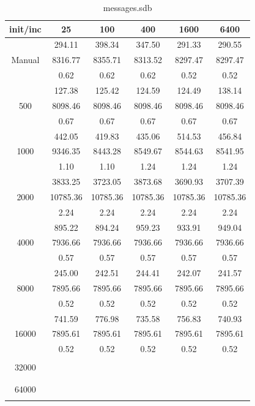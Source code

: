 {\begin{table}[th]
\caption{messages.sdb}
\label{tab:messages.sdb}
\centering
\begin{tabular}{|c||c|c|c|c|c|}
\hline
init/inc & 25 & 100 & 400 & 1600 & 6400 \\ \hline \hline
       & 294.11     & 398.34   & 347.50   & 291.33   & 290.55 \\
Manual & 8316.77    & 8355.71  & 8313.52  & 8297.47  & 8297.47 \\
       & 0.62       & 0.62     & 0.62     & 0.52     & 0.52 \\ \hline
  & 127.38 & 125.42 & 124.59 & 124.49 & 138.14\\ 
500  & 8098.46 & 8098.46 & 8098.46 & 8098.46 & 8098.46\\ 
  & 0.67 & 0.67 & 0.67 & 0.67 & 0.67\\ \hline 
  & 442.05 & 419.83 & 435.06 & 514.53 & 456.84\\ 
1000  & 9346.35 & 8443.28 & 8549.67 & 8544.63 & 8541.95\\ 
  & 1.10 & 1.10 & 1.24 & 1.24 & 1.24\\ \hline 
  & 3833.25 & 3723.05 & 3873.68 & 3690.93 & 3707.39\\ 
2000  & 10785.36 & 10785.36 & 10785.36 & 10785.36 & 10785.36\\ 
  & 2.24 & 2.24 & 2.24 & 2.24 & 2.24\\ \hline 
  & 895.22 & 894.24 & 959.23 & 933.91 & 949.04\\ 
4000  & 7936.66 & 7936.66 & 7936.66 & 7936.66 & 7936.66\\ 
  & 0.57 & 0.57 & 0.57 & 0.57 & 0.57\\ \hline 
  & 245.00 & 242.51 & 244.41 & 242.07 & 241.57\\ 
8000  & 7895.66 & 7895.66 & 7895.66 & 7895.66 & 7895.66\\ 
  & 0.52 & 0.52 & 0.52 & 0.52 & 0.52\\ \hline 
  & 741.59 & 776.98 & 735.58 & 756.83 & 740.93\\ 
16000  & 7895.61 & 7895.61 & 7895.61 & 7895.61 & 7895.61\\ 
  & 0.52 & 0.52 & 0.52 & 0.52 & 0.52\\ \hline 
  &  &  &  &  & \\ 
32000  &  &  &  &  & \\ 
  &  &  &  &  & \\ \hline 
  &  &  &  &  & \\ 
64000  &  &  &  &  & \\ 
  &  &  &  &  & \\ \hline 
\end{tabular}
\end{table}

}
